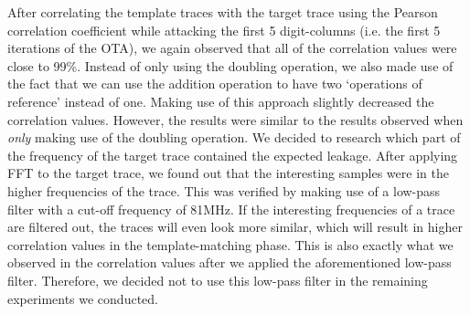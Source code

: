 After correlating the template traces with the target trace using the Pearson correlation coefficient while attacking the first 5 digit-columns (i.e. the first 5 iterations of the OTA), we again observed that all of the correlation values were close to 99\%. 
Instead of only using the doubling operation, we also made use of the fact that we can use the addition operation to have two `operations of reference' instead of one.
Making use of this approach slightly decreased the correlation values.
However, the results were similar to the results observed when \emph{only} making use of the doubling operation.
We decided to research which part of the frequency of the target trace contained the expected leakage.
After applying FFT to the target trace, we found out that the interesting samples were in the higher frequencies of the trace.
This was verified by making use of a low-pass filter with a cut-off frequency of 81MHz.
If the interesting frequencies of a trace are filtered out, the traces will even look more similar, which will result in higher correlation values in the template-matching phase.
This is also exactly what we observed in the correlation values after we applied the aforementioned low-pass filter.
Therefore, we decided not to use this low-pass filter in the remaining experiments we conducted.

